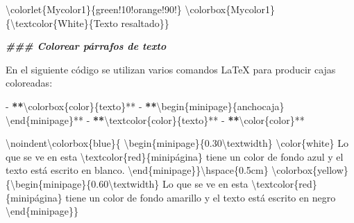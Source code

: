 \documentclass[11pt,a4paper,oneside,]{article}
\newenvironment{Shaded}{\begin{snugshade}}{\end{snugshade}}
\newcommand{\AttributeTok}[1]{\textcolor[rgb]{0.77,0.63,0.00}{#1}}
\newcommand{\DecValTok}[1]{\textcolor[rgb]{0.00,0.00,0.81}{#1}}
\newcommand{\DocumentationTok}[1]{\textcolor[rgb]{0.56,0.35,0.01}{\textbf{\textit{#1}}}}
\newcommand{\ErrorTok}[1]{\textcolor[rgb]{0.64,0.00,0.00}{\textbf{#1}}}
\newcommand{\NormalTok}[1]{#1}
\newcommand{\SpecialCharTok}[1]{\textcolor[rgb]{0.00,0.00,0.00}{#1}}
\newcommand{\StringTok}[1]{\textcolor[rgb]{0.31,0.60,0.02}{#1}}
\numberwithin{dummy}{section}
\theoremstyle{ocrenumbox}
\theoremstyle{blacknumex}
\theoremstyle{blacknumbox}
\theoremstyle{ocrenum}
\theoremstyle{ocrenum}
\begin{document}
\begin{Shaded}
\begin{Highlighting}[numbers=left,,firstnumber=1101,]
\NormalTok{\textbackslash{}colorlet\{Mycolor1\}\{green}\SpecialCharTok{!}\DecValTok{10}\SpecialCharTok{!}\NormalTok{orange}\SpecialCharTok{!}\DecValTok{90}\SpecialCharTok{!}\NormalTok{\}}
\NormalTok{\textbackslash{}colorbox\{Mycolor1\}\{\textbackslash{}textcolor\{White\}\{Texto resaltado\}\}}


\DocumentationTok{\#\#\# Colorear párrafos de texto}

\NormalTok{En el siguiente código se utilizan varios comandos LaTeX para producir cajas coloreadas}\SpecialCharTok{:}

\SpecialCharTok{{-}} \ErrorTok{**}\StringTok{\textasciigrave{}}\AttributeTok{\textbackslash{}colorbox\{color\}\{texto\}}\StringTok{\textasciigrave{}}\SpecialCharTok{**}
\SpecialCharTok{{-}} \ErrorTok{**}\StringTok{\textasciigrave{}}\SpecialCharTok{\textbackslash{}b}\AttributeTok{egin\{minipage\}\{anchocaja\}    }\SpecialCharTok{\textbackslash{}e}\AttributeTok{nd\{minipage\}}\StringTok{\textasciigrave{}}\SpecialCharTok{**}
\SpecialCharTok{{-}} \ErrorTok{**}\StringTok{\textasciigrave{}}\SpecialCharTok{\textbackslash{}t}\AttributeTok{extcolor\{color\}\{texto\}}\StringTok{\textasciigrave{}}\SpecialCharTok{**}
\SpecialCharTok{{-}} \ErrorTok{**}\StringTok{\textasciigrave{}}\AttributeTok{\textbackslash{}color\{color\}}\StringTok{\textasciigrave{}}\SpecialCharTok{**}

\StringTok{\textasciigrave{}\textasciigrave{}\textasciigrave{}}
\SpecialCharTok{\textbackslash{}n}\AttributeTok{oindent\textbackslash{}colorbox\{blue\}\{}
\SpecialCharTok{\textbackslash{}b}\AttributeTok{egin\{minipage\}\{0.30}\SpecialCharTok{\textbackslash{}t}\AttributeTok{extwidth\}}
\AttributeTok{\textbackslash{}color\{white\}}
\AttributeTok{Lo que se ve en esta }\SpecialCharTok{\textbackslash{}t}\AttributeTok{extcolor\{red\}\{minipágina\} }
\AttributeTok{tiene un color de fondo azul y}
\AttributeTok{el texto está escrito en blanco. }
\SpecialCharTok{\textbackslash{}e}\AttributeTok{nd\{minipage\}\}\textbackslash{}hspace\{0.5cm\} }
\AttributeTok{\textbackslash{}colorbox\{yellow\}\{}\SpecialCharTok{\textbackslash{}b}\AttributeTok{egin\{minipage\}\{0.60}\SpecialCharTok{\textbackslash{}t}\AttributeTok{extwidth\} }
\AttributeTok{Lo que se ve en esta }\SpecialCharTok{\textbackslash{}t}\AttributeTok{extcolor\{red\}\{minipágina\} }
\AttributeTok{tiene un color de fondo amarillo y}
\AttributeTok{el texto está escrito en negro}
\SpecialCharTok{\textbackslash{}e}\AttributeTok{nd\{minipage\}\}}
\StringTok{\textasciigrave{}\textasciigrave{}\textasciigrave{}}


\end{Highlighting}
\end{Shaded}
\end{document}
